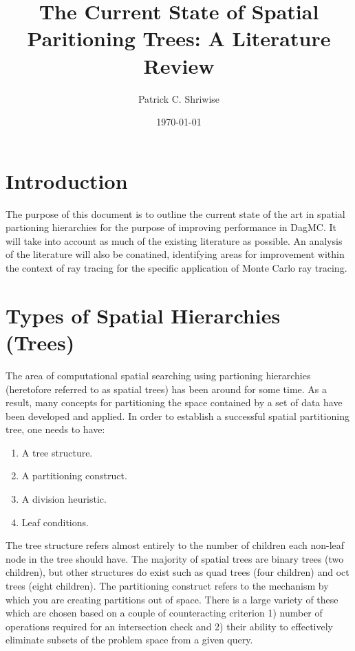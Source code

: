 \documentclass{article}
\title{The Current State of Spatial Paritioning Trees: A Literature Review}
\author{Patrick C. Shriwise}
\date{\today}
\begin{document}
\maketitle

\tableofcontents 

\section{Introduction}

The purpose of this document is to outline the current state of the art in spatial partioning hierarchies for the purpose of improving performance in DagMC. It will take into account as much of the existing literature as possible. An analysis of the literature will also be conatined, identifying areas for improvement within the context of ray tracing for the specific application of Monte Carlo ray tracing. 

\section{Types of Spatial Hierarchies (Trees)}

The area of computational spatial searching using partioning hierarchies (heretofore referred to as spatial trees) has been around for some time. As a result, many concepts for partitioning the space contained by a set of data have been developed and applied. In order to establish a successful spatial partitioning tree, one needs to have: 

\begin{enumerate}
  \item A tree structure.
  \item A partitioning construct.
  \item A division heuristic.
  \item Leaf conditions.
\end{enumerate}

The tree structure refers almost entirely to the number of children each non-leaf node in the tree should have. The majority of spatial trees are binary trees (two children), but other structures do exist such as quad trees (four children) and oct trees (eight children). The partitioning construct refers to the mechanism by which you are creating partitions out of space. There is a large variety of these which are chosen based on a couple of counteracting criterion 1) number of operations required for an intersection check and 2) their ability to effectively eliminate subsets of the problem space from a given query.
 
\end{document}
